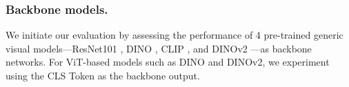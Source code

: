 \documentclass[letterpaper]{article} %
\begin{document}
\subsubsection{Backbone models.}
We initiate our evaluation by assessing the performance of 4 pre-trained generic visual models—ResNet101 \cite{he2016deep}, DINO \cite{dino}, CLIP \cite{radford2021learning}, and DINOv2 \cite{Oquab2023DINOv2LR}—as backbone networks. For ViT-based models such as DINO and DINOv2, we experiment using the CLS Token as the backbone output.


\end{document}
